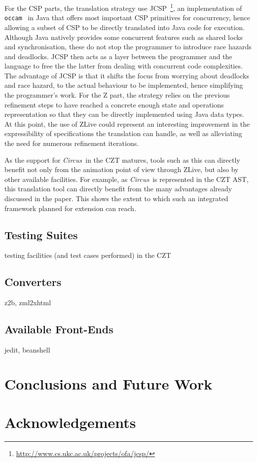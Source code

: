 \documentclass{llncs}
\newcommand{\Circus}{{\sf\slshape Circus}}
\begin{document}
For the CSP parts, the translation strategy use JCSP~\footnote{\url{http://www.cs.ukc.ac.uk/projects/ofa/jcsp/}},
an implementation of \texttt{occam}~\cite{csp.tools:occam} in Java that offers most important
CSP primitives for concurrency, hence allowing a subset of CSP to be directly translated into Java
code for execution. Although Java natively provides some concurrent features such as shared locks and
synchronisation, these do not stop the programmer to introduce race hazards and deadlocks.
JCSP then acts as a layer between the programmer and the language to free the the latter from
dealing with concurrent code complexities.
The advantage of JCSP is that it shifts the focus from worrying about deadlocks and race hazard,
to the actual behaviour to be implemented, hence simplifying the programmer's work.
For the Z part, the strategy relies on the previous refinement steps to have reached a concrete
enough state and operations representation so that they can be directly implemented using Java data types.
At this point, the use of ZLive could represent an interesting improvement in the expressibility
of specifications the translation can handle, as well as alleviating the need for numerous refinement iterations.

As the support for \Circus\ in the CZT matures, tools such as this can directly benefit
not only from the animation point of view through ZLive, but also by other available facilities.
For example, as \Circus\ is represented in the CZT AST, this translation tool can directly
benefit from the many advantages already discussed in the paper.
This shows the extent to which such an integrated framework planned for extension can reach.

\subsection{Testing Suites}

testing facilities (and test cases performed) in the CZT

\subsection{Converters}

z2b, zml2xhtml

\subsection{Available Front-Ends}

jedit, beanshell

\section{Conclusions and Future Work} \label{sec:conclusions}

\section*{Acknowledgements}



\end{document}
